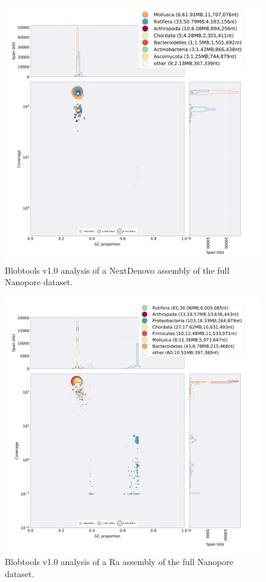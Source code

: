 \begin{suppsection}
  \begin{figure}[ht]
    \centering
     \includegraphics[width=15cm]{fig/benchmark/ONT_ND.png}
   \caption{Blobtools v1.0 analysis of a NextDenovo assembly of the full Nanopore dataset.}
   \label{fig:blobtools_NextDenovo_ont}
 \end{figure}

  \begin{figure}[ht]
    \centering
     \includegraphics[width=15cm]{fig/benchmark/ONT_RA.png}
   \caption{Blobtools v1.0 analysis of a Ra assembly of the full Nanopore dataset.}
   \label{fig:blobtools_ra_ont}
 \end{figure}


\end{suppsection}
